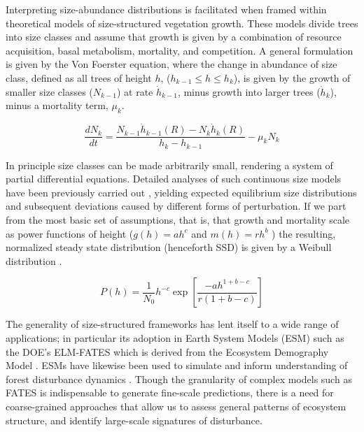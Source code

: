 Interpreting size-abundance distributions is facilitated when framed within theoretical models of size-structured vegetation growth. These models divide trees into size classes and assume that growth is given by a combination of resource acquisition, basal metabolism, mortality, and competition. A general formulation is given by the Von Foerster equation, where the change in abundance of size class, defined as all trees of height $h$, ($h_{k-1} \leq h \leq h_{k} $), is given by the growth of smaller size classes ($N_{k-1}$) at rate $\dot{h}_{k-1}$, minus growth into larger trees ($\dot{h}_{k}$), minus a mortality term, $\mu_{k}$. 

\begin{equation}
    \dfrac{dN_{k}}{dt} = \dfrac{N_{k-1}\dot{h}_{k-1}(R) - N_{k}\dot{h}_{k}(R)}{h_{k}-h_{k-1} }  - \mu_{k}N_{k}
\end{equation}

In principle size classes can be made arbitrarily small, rendering a system of partial differential equations. Detailed analyses of such continuous size models have been previously carried out \cite{enquist_scaling_2024, lee_growth_2021, moorcroft_method_2001,  odwyer_integrative_2009}, yielding expected equilibrium size distributions and subsequent deviations caused by different forms of perturbation. If we part from the most basic set of assumptions, that is, that growth and mortality scale as power functions of height ($g(h) = ah^{c} $ and $m(h)=rh^{b} $ ) the resulting, normalized steady state distribution (henceforth SSD) is given by a Weibull distribution \cite{muller-landau_comparing_2006}.

\begin{equation}
    P(h) = \dfrac{1}{N_{0}} h^{-c} \exp{\left[ \dfrac{-ah^{1+b-c}}{r(1 + b -c )} \right]} 
\end{equation}

The generality of size-structured frameworks has lent itself to a wide range of applications; in particular its adoption in Earth System Models (ESM) such as the DOE’s ELM-FATES which is derived from the Ecosystem Demography Model \cite{fisher_taking_2015, moorcroft_method_2001}. ESMs have likewise been used to simulate and inform understanding of forest disturbance dynamics \cite{shi_functionally_2024}. Though the granularity of complex models such as FATES is indispensable to generate fine-scale predictions, there is a need for coarse-grained approaches that allow us to assess general patterns of ecosystem structure, and identify large-scale signatures of disturbance. 


